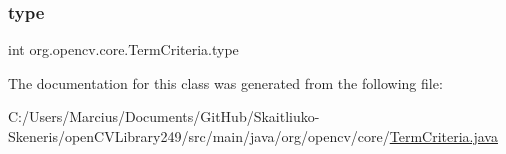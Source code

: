 \mbox{\label{classorg_1_1opencv_1_1core_1_1_term_criteria_a0ec4f89d9e2f07a48fdf3ac94fe1420c}} 
\subsubsection{\texorpdfstring{type}{type}}
{\footnotesize\ttfamily int org.\+opencv.\+core.\+Term\+Criteria.\+type}



The documentation for this class was generated from the following file\+:\begin{DoxyCompactItemize}
\item 
C\+:/\+Users/\+Marcius/\+Documents/\+Git\+Hub/\+Skaitliuko-\/\+Skeneris/open\+C\+V\+Library249/src/main/java/org/opencv/core/\mbox{\hyperlink{_term_criteria_8java}{Term\+Criteria.\+java}}\end{DoxyCompactItemize}
